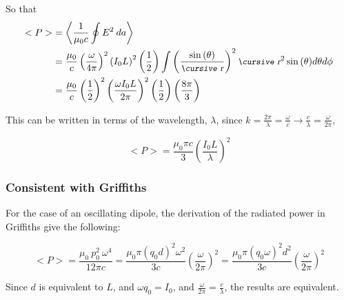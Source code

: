 \documentclass[12pt]{article}
\begin{document}
\begin{flushleft}
So that
\begin{equation*}
\begin{aligned}
<P> & = \left< \frac{1}{\mu_{0}c} \oint E^{2} \: da \right> \\
& = \frac{\mu_{0}}{c}\left( \frac{\omega }{4\pi } \right)^{2}  \left( I_{0}L \right)^{2}\left(\frac{1}{2}\right) \int \left( \frac{\sin{(\theta)}}{\text{\small\slshape\cursive r}} \right)^{2} \text{\small\slshape\cursive r}^{2}\sin{(\theta)}d\theta d\phi \\
& = \frac{\mu_{0}}{c}\left( \frac{1}{2}\right)^{2} \left( \frac{\omega  I_{0}L }{2 \pi}  \right)^{2}\left(\frac{1}{2}\right) \left( \frac{8\pi}{3} \right) \\
\end{aligned}
\end{equation*}

This can be written in terms of the wavelength, $\lambda$, since $k=\frac{2\pi}{\lambda}=\frac{\omega}{c} \rightarrow \frac{c}{\lambda}=\frac{\omega}{2\pi}$, 

\[
<P> = \frac{\mu_{0}\pi c}{3}\left( \frac{I_{0}L}{\lambda} \right)^{2}
\]


\subsubsection*{Consistent with Griffiths}

For the case of an oscillating dipole, the derivation of the radiated power in Griffiths give the following:

\[
<P> = \frac{\mu_{0} \: p_{0}^{2}\: \omega^{4}}{12 \pi c} = \frac{\mu_{0} \pi (q_{0}d)^{2}\omega^{2}}{3 c}\left( \frac{\omega}{2 \pi} \right)^{2}  = \frac{\mu_{0} \pi (q_{0}\omega)^{2}d^{2}}{3 c}\left( \frac{\omega}{2 \pi} \right)^{2}
\]

Since $d$ is equivalent to $L$, and $\omega q_{0} = I_{0}$, and $\frac{\omega}{2\pi}=\frac{c}{\lambda}$, the results are equivalent.

\end{flushleft}
\end{document}
